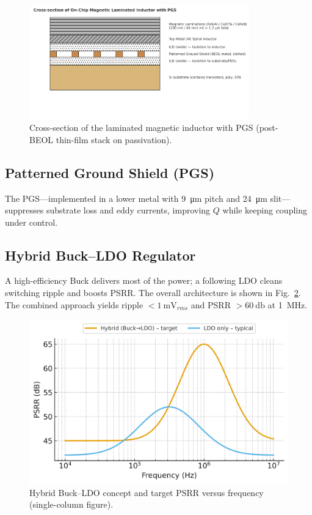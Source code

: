 \documentclass[journal]{IEEEtran}
\begin{document}
\begin{figure}[t]
  \centering
  \includegraphics[width=0.85\textwidth]{fig/fig1_laminated_cross_section.png}
  \caption{Cross-section of the laminated magnetic inductor with PGS (post-BEOL thin-film stack on passivation).}
  \label{fig:cross}
\end{figure}

\subsection{Patterned Ground Shield (PGS)}
The PGS---implemented in a lower metal with \SI{9}{\um} pitch and \SI{24}{\um} slit---suppresses substrate loss and eddy currents, improving $Q$ while keeping coupling under control.

\subsection{Hybrid Buck--LDO Regulator}
A high-efficiency Buck delivers most of the power; a following LDO cleans switching ripple and boosts PSRR. The overall architecture is shown in Fig.~\ref{fig:block}. The combined approach yields ripple $<\SI{1}{\milli\volt_{rms}}$ and PSRR $>\SI{60}{\decibel}$ at \SI{1}{\mega\hertz}.

\begin{figure}[t]
  \centering
  \includegraphics[width=.85\linewidth]{fig/fig4_psrr_target.png}%
  \caption{Hybrid Buck--LDO concept and target PSRR versus frequency (single-column figure).}
  \label{fig:block}
\end{figure}
\end{document}
